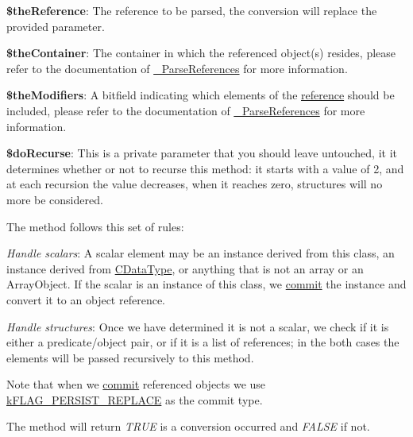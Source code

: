 \begin{DoxyItemize}
\item {\bfseries \$the\-Reference}\-: The reference to be parsed, the conversion will replace the provided parameter. 
\item {\bfseries \$the\-Container}\-: The container in which the referenced object(s) resides, please refer to the documentation of \hyperlink{class_c_persistent_unit_object_ae74127a9fb936d8cf5aeed30315ac05b}{\-\_\-\-Parse\-References} for more information. 
\item {\bfseries \$the\-Modifiers}\-: A bitfield indicating which elements of the \hyperlink{class_c_container_a1486a3cb34d24ff1c3028ad4360b5dc6}{reference} should be included, please refer to the documentation of \hyperlink{class_c_persistent_unit_object_ae74127a9fb936d8cf5aeed30315ac05b}{\-\_\-\-Parse\-References} for more information. 
\item {\bfseries \$do\-Recurse}\-: This is a private parameter that you should leave untouched, it it determines whether or not to recurse this method\-: it starts with a value of 2, and at each recursion the value decreases, when it reaches zero, structures will no more be considered. 
\end{DoxyItemize}

The method follows this set of rules\-:


\begin{DoxyItemize}
\item {\itshape Handle scalars}\-: A scalar element may be an instance derived from this class, an instance derived from \hyperlink{class_c_data_type}{C\-Data\-Type}, or anything that is not an array or an Array\-Object. If the scalar is an instance of this class, we \hyperlink{class_c_persistent_object_a88b1f2b11d3d60e0b3d33d8b0649b68a}{commit} the instance and convert it to an object reference. 
\item {\itshape Handle structures}\-: Once we have determined it is not a scalar, we check if it is either a predicate/object pair, or if it is a list of references; in the both cases the elements will be passed recursively to this method. 
\end{DoxyItemize}

Note that when we \hyperlink{class_c_persistent_object_a88b1f2b11d3d60e0b3d33d8b0649b68a}{commit} referenced objects we use \hyperlink{}{k\-F\-L\-A\-G\-\_\-\-P\-E\-R\-S\-I\-S\-T\-\_\-\-R\-E\-P\-L\-A\-C\-E} as the commit type.

The method will return {\itshape T\-R\-U\-E} is a conversion occurred and {\itshape F\-A\-L\-S\-E} if not.


